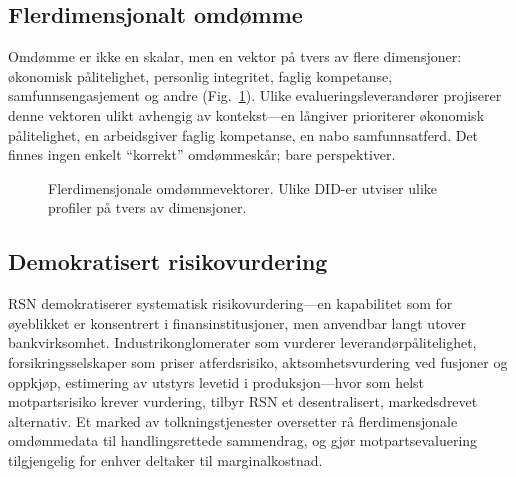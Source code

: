 \documentclass[11pt,a4paper,twocolumn]{article}
\begin{document}
\subsection{Flerdimensjonalt omdømme}

Omdømme er ikke en skalar, men en vektor på tvers av flere dimensjoner: økonomisk pålitelighet, personlig integritet, faglig kompetanse, samfunnsengasjement og andre (Fig.~\ref{fig:reputation-radar}). Ulike evalueringsleverandører projiserer denne vektoren ulikt avhengig av kontekst---en långiver prioriterer økonomisk pålitelighet, en arbeidsgiver faglig kompetanse, en nabo samfunnsatferd. Det finnes ingen enkelt ``korrekt'' omdømmeskår; bare perspektiver.

\begin{figure}[ht]
\centering
{}
\caption{Flerdimensjonale omdømmevektorer. Ulike DID-er utviser ulike profiler på tvers av dimensjoner.}
\label{fig:reputation-radar}
\end{figure}

\subsection{Demokratisert risikovurdering}

RSN demokratiserer systematisk risikovurdering---en kapabilitet som for øyeblikket er konsentrert i finansinstitusjoner, men anvendbar langt utover bankvirksomhet. Industrikonglomerater som vurderer leverandørpålitelighet, forsikringsselskaper som priser atferdsrisiko, aktsomhetsvurdering ved fusjoner og oppkjøp, estimering av utstyrs levetid i produksjon---hvor som helst motpartsrisiko krever vurdering, tilbyr RSN et desentralisert, markedsdrevet alternativ. Et marked av tolkningstjenester oversetter rå flerdimensjonale omdømmedata til handlingsrettede sammendrag, og gjør motpartsevaluering tilgjengelig for enhver deltaker til marginalkostnad.
\end{document}

